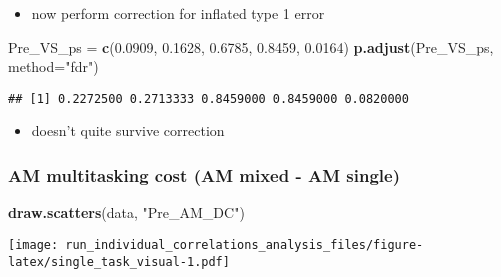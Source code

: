 \documentclass[]{article}
\newenvironment{Shaded}{\begin{snugshade}}{\end{snugshade}}
\newcommand{\KeywordTok}[1]{\textcolor[rgb]{0.13,0.29,0.53}{\textbf{#1}}}
\newcommand{\DataTypeTok}[1]{\textcolor[rgb]{0.13,0.29,0.53}{#1}}
\newcommand{\FloatTok}[1]{\textcolor[rgb]{0.00,0.00,0.81}{#1}}
\newcommand{\StringTok}[1]{\textcolor[rgb]{0.31,0.60,0.02}{#1}}
\newcommand{\OperatorTok}[1]{\textcolor[rgb]{0.81,0.36,0.00}{\textbf{#1}}}
\newcommand{\NormalTok}[1]{#1}
\providecommand{\tightlist}{%
  \setlength{\itemsep}{0pt}\setlength{\parskip}{0pt}}
\begin{document}
\begin{itemize}
\tightlist
\item
  now perform correction for inflated type 1 error
\end{itemize}

\begin{Shaded}
\begin{Highlighting}[]
\NormalTok{Pre_VS_ps =}\StringTok{ }\KeywordTok{c}\NormalTok{(}\FloatTok{0.0909}\NormalTok{, }\FloatTok{0.1628}\NormalTok{, }\FloatTok{0.6785}\NormalTok{, }\FloatTok{0.8459}\NormalTok{, }\FloatTok{0.0164}\NormalTok{)}
\KeywordTok{p.adjust}\NormalTok{(Pre_VS_ps, }\DataTypeTok{method=}\StringTok{"fdr"}\NormalTok{)}
\end{Highlighting}
\end{Shaded}

\begin{verbatim}
## [1] 0.2272500 0.2713333 0.8459000 0.8459000 0.0820000
\end{verbatim}

\begin{itemize}
\tightlist
\item
  doesn't quite survive correction
\end{itemize}

\subsubsection{AM multitasking cost (AM mixed - AM
single)}\label{am-multitasking-cost-am-mixed---am-single}

\begin{Shaded}
\begin{Highlighting}[]
\KeywordTok{draw.scatters}\NormalTok{(data, }\StringTok{"Pre_AM_DC"}\NormalTok{)}
\end{Highlighting}
\end{Shaded}

\texttt{[image: run\_individual\_correlations\_analysis\_files/figure-latex/single\_task\_visual-1.pdf]}

\begin{Shaded}
\end{Shaded}
\end{document}
